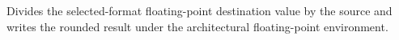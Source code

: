Divides the selected-format floating-point destination value by the source and writes the rounded result under the architectural floating-point environment.
